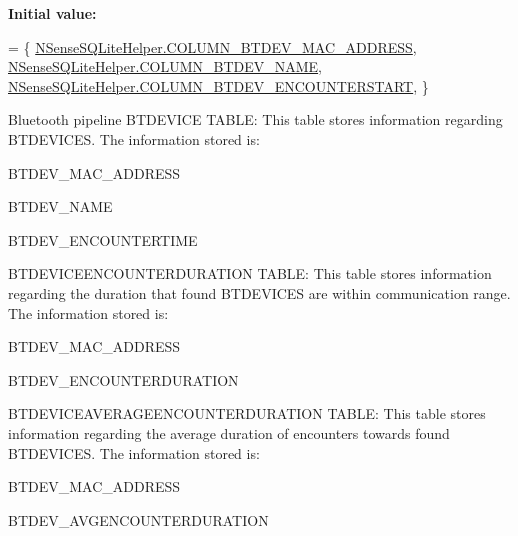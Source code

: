 {\bfseries Initial value\-:}
\begin{DoxyCode}
= \{ 
            \hyperlink{classcs_1_1nsense_1_1db_1_1_n_sense_s_q_lite_helper_a66d760b81948efc86eafb0bb5147c2a5}{NSenseSQLiteHelper.COLUMN\_BTDEV\_MAC\_ADDRESS},
            \hyperlink{classcs_1_1nsense_1_1db_1_1_n_sense_s_q_lite_helper_aa5c997c964929bd8d27ae424aec82f4d}{NSenseSQLiteHelper.COLUMN\_BTDEV\_NAME},
            \hyperlink{classcs_1_1nsense_1_1db_1_1_n_sense_s_q_lite_helper_a9356c28b162b3997d82d6c078634ec10}{NSenseSQLiteHelper.COLUMN\_BTDEV\_ENCOUNTERSTART},
    \}
\end{DoxyCode}
Bluetooth pipeline B\-T\-D\-E\-V\-I\-C\-E T\-A\-B\-L\-E\-: This table stores information regarding B\-T\-D\-E\-V\-I\-C\-E\-S. The information stored is\-:
\begin{DoxyItemize}
\item B\-T\-D\-E\-V\-\_\-\-M\-A\-C\-\_\-\-A\-D\-D\-R\-E\-S\-S
\item B\-T\-D\-E\-V\-\_\-\-N\-A\-M\-E
\item B\-T\-D\-E\-V\-\_\-\-E\-N\-C\-O\-U\-N\-T\-E\-R\-T\-I\-M\-E
\end{DoxyItemize}

B\-T\-D\-E\-V\-I\-C\-E\-E\-N\-C\-O\-U\-N\-T\-E\-R\-D\-U\-R\-A\-T\-I\-O\-N T\-A\-B\-L\-E\-: This table stores information regarding the duration that found B\-T\-D\-E\-V\-I\-C\-E\-S are within communication range. The information stored is\-:
\begin{DoxyItemize}
\item B\-T\-D\-E\-V\-\_\-\-M\-A\-C\-\_\-\-A\-D\-D\-R\-E\-S\-S
\item B\-T\-D\-E\-V\-\_\-\-E\-N\-C\-O\-U\-N\-T\-E\-R\-D\-U\-R\-A\-T\-I\-O\-N
\end{DoxyItemize}

B\-T\-D\-E\-V\-I\-C\-E\-A\-V\-E\-R\-A\-G\-E\-E\-N\-C\-O\-U\-N\-T\-E\-R\-D\-U\-R\-A\-T\-I\-O\-N T\-A\-B\-L\-E\-: This table stores information regarding the average duration of encounters towards found B\-T\-D\-E\-V\-I\-C\-E\-S. The information stored is\-:
\begin{DoxyItemize}
\item B\-T\-D\-E\-V\-\_\-\-M\-A\-C\-\_\-\-A\-D\-D\-R\-E\-S\-S
\item B\-T\-D\-E\-V\-\_\-\-A\-V\-G\-E\-N\-C\-O\-U\-N\-T\-E\-R\-D\-U\-R\-A\-T\-I\-O\-N
\end{DoxyItemize}

